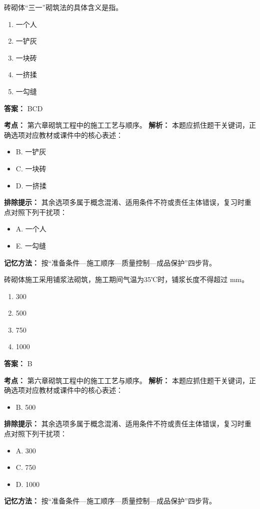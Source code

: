\documentclass[UTF8,fontset=fandol,11pt]{ctexart}
\begin{document}
\vspace{0.2em}

\begin{quizbox}[title={第 12 题}]
砖砌体“三一”砌筑法的具体含义是指。\\
\begin{enumerate}[label=\Alph*.]
\item 一个人
\item 一铲灰
\item 一块砖
\item 一挤揉
\item 一勾缝
\end{enumerate}
\textbf{答案：} BCD
\vspace{0.25em}
\begin{answerbox}[title={考点解析}]
\textbf{考点：} 第六章砌筑工程中的施工工艺与顺序。
\textbf{解析：} 本题应抓住题干关键词，正确选项对应教材或课件中的核心表述：
\begin{itemize}
\item B. 一铲灰
\item C. 一块砖
\item D. 一挤揉
\end{itemize}
\textbf{排除提示：} 其余选项多属于概念混淆、适用条件不符或责任主体错误，复习时重点对照下列干扰项：
\begin{itemize}
\item A. 一个人
\item E. 一勾缝
\end{itemize}
\textbf{记忆方法：} 按“准备条件—施工顺序—质量控制—成品保护”四步背。
\end{answerbox}
\end{quizbox}

\vspace{0.2em}

\begin{quizbox}[title={第 13 题}]
砖砌体施工采用铺浆法砌筑，施工期间气温为35℃时，铺浆长度不得超过 mm。\\
\begin{enumerate}[label=\Alph*.]
\item 300
\item 500
\item 750
\item 1000
\end{enumerate}
\textbf{答案：} B
\vspace{0.25em}
\begin{answerbox}[title={考点解析}]
\textbf{考点：} 第六章砌筑工程中的施工工艺与顺序。
\textbf{解析：} 本题应抓住题干关键词，正确选项对应教材或课件中的核心表述：
\begin{itemize}
\item B. 500
\end{itemize}
\textbf{排除提示：} 其余选项多属于概念混淆、适用条件不符或责任主体错误，复习时重点对照下列干扰项：
\begin{itemize}
\item A. 300
\item C. 750
\item D. 1000
\end{itemize}
\textbf{记忆方法：} 按“准备条件—施工顺序—质量控制—成品保护”四步背。
\end{answerbox}
\end{quizbox}
\end{document}
